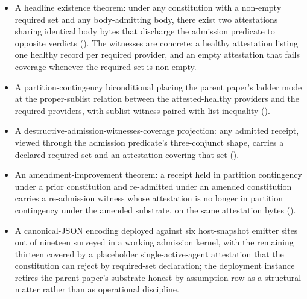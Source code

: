 \begin{itemize}
  \item A headline existence theorem: under any constitution with a non-empty required set and any body-admitting body, there exist two attestations sharing identical body bytes that discharge the admission predicate to opposite verdicts (). The witnesses are concrete: a healthy attestation listing one healthy record per required provider, and an empty attestation that fails coverage whenever the required set is non-empty.
  \item A partition-contingency biconditional placing the parent paper's ladder mode at the proper-sublist relation between the attested-healthy providers and the required providers, with sublist witness paired with list inequality ().
  \item A destructive-admission-witnesses-coverage projection: any admitted receipt, viewed through the admission predicate's three-conjunct shape, carries a declared required-set and an attestation covering that set ().
  \item An amendment-improvement theorem: a receipt held in partition contingency under a prior constitution and re-admitted under an amended constitution carries a re-admission witness whose attestation is no longer in partition contingency under the amended substrate, on the same attestation bytes ().
  \item A canonical-JSON encoding deployed against six host-snapshot emitter sites out of nineteen surveyed in a working admission kernel, with the remaining thirteen covered by a placeholder single-active-agent attestation that the constitution can reject by required-set declaration; the deployment instance retires the parent paper's substrate-honest-by-assumption row as a structural matter rather than as operational discipline.
\end{itemize}

